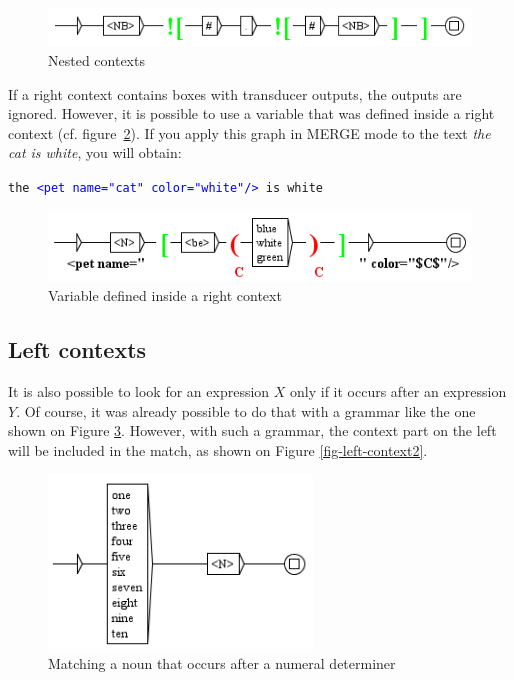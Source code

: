 \bigskip
\begin{figure}[!h]
\begin{center}
\includegraphics[width=12cm]{resources/img/fig6-16.png}
\caption{Nested contexts\label{fig-context5}}
\end{center}
\end{figure}

\bigskip
\noindent If a right context contains boxes with transducer outputs, the
outputs are ignored. However, it is possible to use a variable that was defined inside a
right context (cf. figure~\ref{fig-context6}). If you apply this graph in MERGE
mode to the text \textit{the cat is white}, you will obtain:

\bigskip
\texttt{the \textcolor{blue}{<pet name="cat" color="white"/>} is white}

\bigskip

\begin{figure}[!h]
\begin{center}
\includegraphics[width=12.2cm]{resources/img/fig6-17.png}
\caption{Variable defined inside a right context\label{fig-context6}}
\end{center}
\end{figure}

\subsection{Left contexts}
\index{\verb+$*+}
It is also possible to look for an expression $X$ only if it
occurs after an expression $Y$. Of course, it was already possible to do that with a grammar
like the one shown on Figure \ref{fig-left-context1}. However, with such a
grammar, the context part on the left will be included in the match, as shown on Figure
\ref{fig-left-context2}.

\begin{figure}[!ht]
\begin{center}
\includegraphics[width=7cm]{resources/img/fig6-17a.png}
\caption{Matching a noun that occurs after a numeral
determiner\label{fig-left-context1}}
\end{center}
\end{figure}

